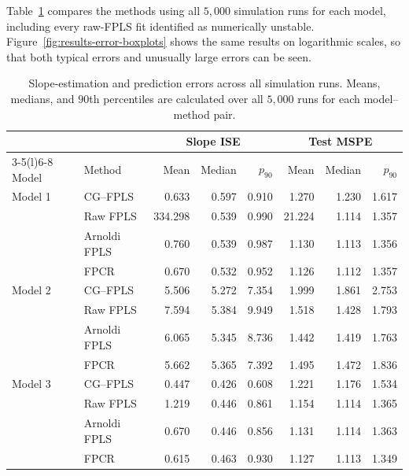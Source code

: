 Table~\ref{tab:results-primary-risk} compares the methods using all $5{,}000$
simulation runs for each model, including every raw-FPLS fit identified as
numerically unstable. Figure~\ref{fig:results-error-boxplots} shows the same
results on logarithmic scales, so that both typical errors and unusually
large errors can be seen.

\begin{table}[htbp]
    \centering
    \scriptsize
    \caption[Slope and prediction errors across all simulation runs]{Slope-estimation and prediction errors across all simulation runs. Means,
    medians, and $90$th percentiles are calculated over all $5{,}000$
    runs for each model--method pair.}
    \label{tab:results-primary-risk}
    \begin{tabular}{@{}llrrrrrr@{}}
        \toprule
        & & \multicolumn{3}{c}{Slope ISE}
          & \multicolumn{3}{c}{Test MSPE} \\
        \cmidrule(lr){3-5}\cmidrule(l){6-8}
        Model & Method & Mean & Median & $p_{90}$ & Mean & Median & $p_{90}$ \\
        \midrule
        Model 1 & CG--FPLS       & 0.633 & 0.597 & 0.910 & 1.270 & 1.230 & 1.617 \\
                & Raw FPLS       & 334.298 & 0.539 & 0.990 & 21.224 & 1.114 & 1.357 \\
                & Arnoldi FPLS   & 0.760 & 0.539 & 0.987 & 1.130 & 1.113 & 1.356 \\
                & FPCR           & 0.670 & 0.532 & 0.952 & 1.126 & 1.112 & 1.357 \\
        \addlinespace
        Model 2 & CG--FPLS       & 5.506 & 5.272 & 7.354 & 1.999 & 1.861 & 2.753 \\
                & Raw FPLS       & 7.594 & 5.384 & 9.949 & 1.518 & 1.428 & 1.793 \\
                & Arnoldi FPLS   & 6.065 & 5.345 & 8.736 & 1.442 & 1.419 & 1.763 \\
                & FPCR           & 5.662 & 5.365 & 7.392 & 1.495 & 1.472 & 1.836 \\
        \addlinespace
        Model 3 & CG--FPLS       & 0.447 & 0.426 & 0.608 & 1.221 & 1.176 & 1.534 \\
                & Raw FPLS       & 1.219 & 0.446 & 0.861 & 1.154 & 1.114 & 1.365 \\
                & Arnoldi FPLS   & 0.670 & 0.446 & 0.856 & 1.131 & 1.114 & 1.363 \\
                & FPCR           & 0.615 & 0.463 & 0.930 & 1.127 & 1.113 & 1.349 \\
        \bottomrule
    \end{tabular}
\end{table}

